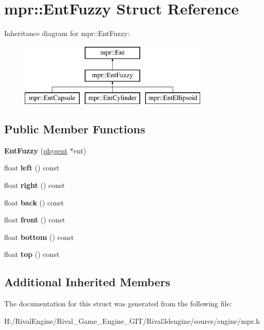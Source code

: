 \hypertarget{structmpr_1_1_ent_fuzzy}{}\section{mpr\+:\+:Ent\+Fuzzy Struct Reference}
\label{structmpr_1_1_ent_fuzzy}
Inheritance diagram for mpr\+:\+:Ent\+Fuzzy\+:\begin{figure}[H]
\begin{center}
\leavevmode
\includegraphics[height=3.000000cm]{structmpr_1_1_ent_fuzzy}
\end{center}
\end{figure}
\subsection*{Public Member Functions}
\begin{DoxyCompactItemize}
\item 
\mbox{\label{structmpr_1_1_ent_fuzzy_adbacd7a821b7f9a66a1387b1d311e504}} 
{\bfseries Ent\+Fuzzy} (\hyperlink{structphysent}{physent} $\ast$ent)
\item 
\mbox{\label{structmpr_1_1_ent_fuzzy_a98b9105fdc822a5e80c38a9cd0eb77d9}} 
float {\bfseries left} () const
\item 
\mbox{\label{structmpr_1_1_ent_fuzzy_a5878f71efa456acc0aec1e9e6c4535df}} 
float {\bfseries right} () const
\item 
\mbox{\label{structmpr_1_1_ent_fuzzy_ab2b29319894c7687391e67ef816fb092}} 
float {\bfseries back} () const
\item 
\mbox{\label{structmpr_1_1_ent_fuzzy_a0ffdd59c9159ab3dde3ab2095c173d7a}} 
float {\bfseries front} () const
\item 
\mbox{\label{structmpr_1_1_ent_fuzzy_a9ae63300abca95f4d0b470594551ab83}} 
float {\bfseries bottom} () const
\item 
\mbox{\label{structmpr_1_1_ent_fuzzy_aa5397d1e9f657b0526a8254715b03675}} 
float {\bfseries top} () const
\end{DoxyCompactItemize}
\subsection*{Additional Inherited Members}


The documentation for this struct was generated from the following file\+:\begin{DoxyCompactItemize}
\item 
H\+:/\+Rival\+Engine/\+Rival\+\_\+\+Game\+\_\+\+Engine\+\_\+\+G\+I\+T/\+Rival3dengine/source/engine/mpr.\+h\end{DoxyCompactItemize}
